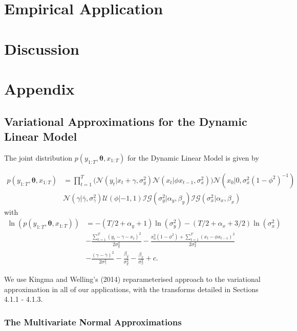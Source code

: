 \documentclass[12pt,a4paper]{article}%
\numberwithin{equation}{section}
\begin{document}
\section{Empirical Application}

\section{Discussion}


\newpage
\section{Appendix}
\iffalse %

\subsection{Variational Approximations for the Dynamic Linear Model}

The joint distribution $p(y_{1:T}, \boldsymbol{\theta}, x_{1:T})$ for the Dynamic Linear Model is given by

\begin{align}
p(y_{1:T}, \boldsymbol{\theta}, x_{1:T}) &= \prod_{t=1}^{T} \bigg( \mathcal{N}(y_t | x_t + \gamma, \sigma^2_y) \mathcal{N}(x_t | \phi x_{t-1}, \sigma^2_x) \bigg) \mathcal{N}(x_0 | 0, \sigma^2_x (1 - \phi^2)^{-1}) \nonumber \\
&\mathcal{N}(\gamma | \bar{\gamma}, \sigma^2_{\gamma}) \mathcal{U}(\phi | -1, 1) \mathcal{IG}(\sigma^2_y | \alpha_y, \beta_y)\mathcal{IG}(\sigma^2_x | \alpha_x, \beta_x) 
\end{align}
with 
\begin{align}
\ln(p(y_{1:T}, \boldsymbol{\theta}, x_{1:T})) &= -(T/2 + \alpha_y + 1) \ln(\sigma_y^2) -(T/2 + \alpha_x + 3/2) \ln(\sigma_x^2) \nonumber \\
&- \frac{\sum_{t=1}^{T}(y_t - \gamma - x_t)^2}{2 \sigma^2_y} - \frac{x_0^2(1 -\phi^2) + \sum_{t=1}^{T}(x_t - \phi x_{t-1})^2}{2 \sigma^2_x} \nonumber \\
&- \frac{(\gamma - \bar{\gamma})^2}{2 \sigma^2_{\gamma}} - \frac{\beta_y}{\sigma^2_y} - \frac{\beta_x}{\sigma^2_x} + c \label{logjoint}. 
\end{align}

We use Kingma and Welling's (2014) reparameterised approach to the variational approximation in all of our applications, with the transforms detailed in Sections 4.1.1 - 4.1.3.

\subsubsection{The Multivariate Normal Approximations}
\end{document}

